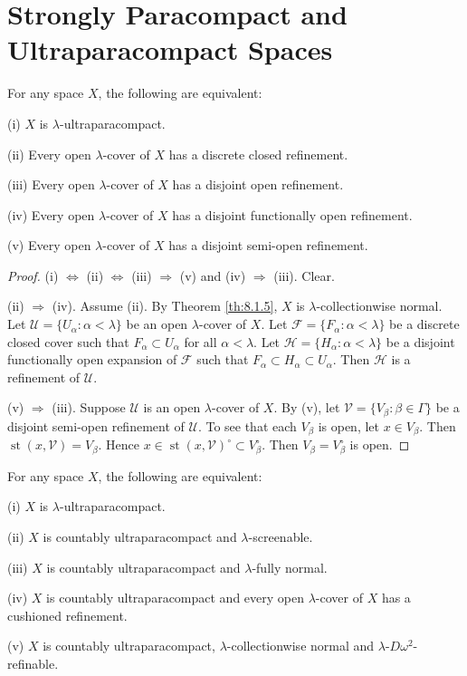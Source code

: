 \documentclass[jiang8iv.tex]{subfiles}
\begin{document}
	
\section{Strongly Paracompact and Ultraparacompact Spaces} \label{sec:8.3}


{\theorem{\label{th:8.3.1}} 
For any space $X$, the following are equivalent:

\textup{(i)} \(X\) is \(\lambda\)-ultraparacompact.

\textup{(ii)} Every open \(\lambda\)-cover of \(X\) has a discrete closed refinement.

\textup{(iii)}  Every open \(\lambda\)-cover of \(X\) has a disjoint open refinement.

\textup{(iv)}  Every open \(\lambda\)-cover of \(X\) has a disjoint functionally open refinement.

\textup{(v)} Every open \(\lambda\)-cover of \(X\) has a disjoint semi-open refinement.
}

\begin{proof}
(i) \(\Leftrightarrow\) (ii) \(\Leftrightarrow\) (iii)  \(\Rightarrow\)  (v) 
and (iv) \(\Rightarrow\) (iii).  Clear.

(ii) \(\Rightarrow\) (iv). Assume (ii). By Theorem \ref{th:8.1.5},
$X$ is $\lambda$-collectionwise normal.
Let \(\mathscr{U}= \{U_\alpha: \alpha < \lambda\}\) be an open \(\lambda\)-cover of \(X\). 
Let \(\mathscr{F}= \{F_\alpha: \alpha < \lambda\}\) be a discrete closed cover such that 
$F_\alpha\subset U_\alpha$ for all $\alpha < \lambda$.
Let  $\mathscr{H}= \{H_\alpha: \alpha < \lambda\}$ be a disjoint functionally open 
expansion of \(\mathscr{F}\) such that $F_\alpha \subset H_\alpha \subset U_\alpha$.
Then $\mathscr{H}$ is a refinement of $\mathscr{U}$.

(v) \(\Rightarrow\) (iii). Suppose \(\mathscr{U}\) is an open \(\lambda\)-cover of \(X\). 
By (v), let \(\mathscr{V} = \{V_\beta: \beta\in \Gamma\}\) be a disjoint semi-open refinement 
of \(\mathscr{U}\). To see that each $V_\beta$ is open, let $x\in V_\beta$. Then
$\operatorname{st}(x, \mathscr{V}) = V_\beta$. 
Hence $x\in \operatorname{st}(x, \mathscr{V}) ^\circ\subset V_\beta^\circ$.
Then $V_\beta = V_\beta^\circ$ is open.
\end{proof} 

{\theorem{\label{th:8.3.2}} 
 For any space $X$, the following are equivalent:

\textup{(i)} \(X\) is \(\lambda\)-ultraparacompact.

\textup{(ii)} \(X\) is countably ultraparacompact and $\lambda$-screenable.

\textup{(iii)} \(X\) is countably ultraparacompact and $\lambda$-fully normal.

\textup{(iv)}  \(X\) is countably ultraparacompact and every open \(\lambda\)-cover 
of \(X\) has a  cushioned refinement.

\textup{(v)}  \(X\) is countably ultraparacompact, $\lambda$-collectionwise normal
and $\lambda$-$D\omega^2$-refinable.
}
\end{document}
